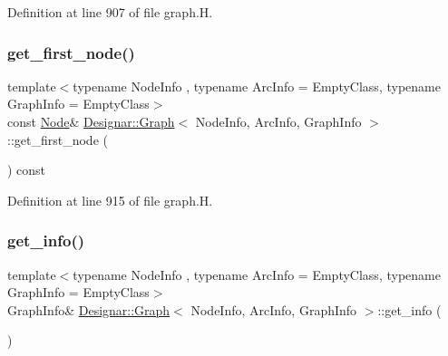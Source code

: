 Definition at line 907 of file graph.\+H.

\mbox{\label{class_designar_1_1_graph_a2c27cdec559e9773deebec6f1af25a99}} 
\subsubsection{\texorpdfstring{get\+\_\+first\+\_\+node()}{get\_first\_node()}\hspace{0.1cm}{\footnotesize\ttfamily [2/2]}}
{\footnotesize\ttfamily template$<$typename Node\+Info , typename Arc\+Info  = Empty\+Class, typename Graph\+Info  = Empty\+Class$>$ \\
const \hyperlink{class_designar_1_1_graph_a5dfc7dba9d092ac489c72e40390c37d0}{Node}\& \hyperlink{class_designar_1_1_graph}{Designar\+::\+Graph}$<$ Node\+Info, Arc\+Info, Graph\+Info $>$\+::get\+\_\+first\+\_\+node (\begin{DoxyParamCaption}{ }\end{DoxyParamCaption}) const\hspace{0.3cm}{\ttfamily [inline]}}



Definition at line 915 of file graph.\+H.

\mbox{\label{class_designar_1_1_graph_a5b84c02e86c7887333df2d8934079678}} 
\subsubsection{\texorpdfstring{get\+\_\+info()}{get\_info()}\hspace{0.1cm}{\footnotesize\ttfamily [1/2]}}
{\footnotesize\ttfamily template$<$typename Node\+Info , typename Arc\+Info  = Empty\+Class, typename Graph\+Info  = Empty\+Class$>$ \\
Graph\+Info\& \hyperlink{class_designar_1_1_graph}{Designar\+::\+Graph}$<$ Node\+Info, Arc\+Info, Graph\+Info $>$\+::get\+\_\+info (\begin{DoxyParamCaption}{ }\end{DoxyParamCaption})\hspace{0.3cm}{\ttfamily [inline]}}



